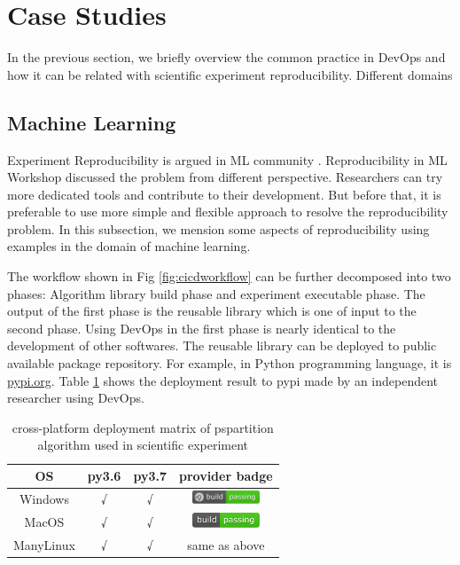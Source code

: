\documentclass{IEEEcsmag}
\begin{document}
\section{Case Studies}
In the previous section, we briefly overview the common practice in DevOps and how it can be related with scientific experiment reproducibility. Different domains 

\subsection{Machine Learning}
Experiment Reproducibility is argued in ML community \cite{kegl2018ramp}. Reproducibility in ML Workshop discussed the problem from different perspective. Researchers can try more dedicated tools and contribute to their development. But before that, it is preferable to use more simple and flexible approach to resolve the reproducibility problem. In this subsection, we mension some aspects of reproducibility using examples in the domain of machine learning.

The workflow shown in Fig \ref{fig:cicdworkflow} can be further decomposed into two phases:
Algorithm library build phase and experiment executable phase. The output of the first phase is the reusable library which is one of input to the second phase. Using DevOps in the first phase is nearly identical to the development of other softwares. 
The reusable library can be deployed to public available package repository. For example, in Python programming language, it is \url{pypi.org}. Table \ref{tab:deploy} shows the deployment result to pypi made by an independent researcher using DevOps. 
\begin{table}
\centering
\begin{tabular}{|c|c|c|c|}
\hline
OS & py3.6 & py3.7  & provider badge\\
\hline
Windows & √ & √  & \includegraphics[width=2cm]{./appveyor.pdf}\\ 
\hline
MacOS & √ & √ & \includegraphics[width=2cm]{./travis.pdf}\\ 
\hline
ManyLinux & √ & √ & same as above \\
\hline
\end{tabular}
\caption{cross-platform deployment matrix of pspartition algorithm used in scientific experiment}\label{tab:deploy}
\end{table}
\end{document}
